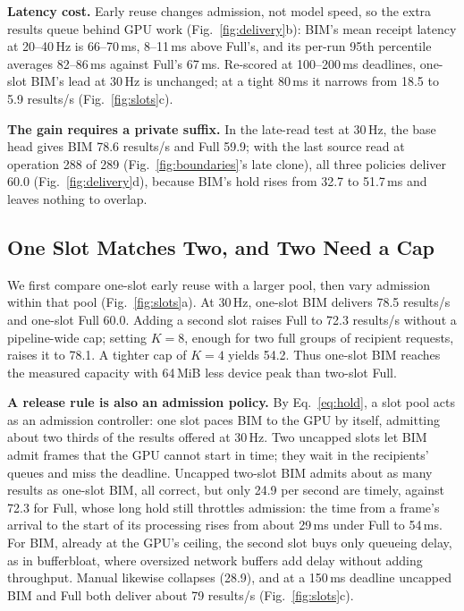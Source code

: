 \documentclass[conference]{IEEEtran}
\newcommand{\MiB}{\,MiB}
\newcommand{\ms}{\,ms}
\newcommand{\Hz}{\,Hz}
\begin{document}
\textbf{Latency cost.} Early reuse changes admission, not model speed, so the extra results queue behind GPU work (Fig.~\ref{fig:delivery}b): BIM's mean receipt latency at 20--40\Hz{} is 66--70\ms, 8--11\ms{} above Full's, and its per-run 95th percentile averages 82--86\ms{} against Full's 67\ms. Re-scored at 100--200\ms{} deadlines, one-slot BIM's lead at 30\Hz{} is unchanged; at a tight 80\ms{} it narrows from 18.5 to 5.9 results/s (Fig.~\ref{fig:slots}c).

\textbf{The gain requires a private suffix.}\label{sec:eval-late} In the late-read test at 30\Hz, the base head gives BIM 78.6 results/s and Full 59.9; with the last source read at operation 288 of 289 (Fig.~\ref{fig:boundaries}'s late clone), all three policies deliver 60.0 (Fig.~\ref{fig:delivery}d), because BIM's hold rises from 32.7 to 51.7\ms{} and leaves nothing to overlap.

\subsection{One Slot Matches Two, and Two Need a Cap}
\label{sec:eval-slots}

We first compare one-slot early reuse with a larger pool, then vary admission within that pool (Fig.~\ref{fig:slots}a). At 30\Hz, one-slot BIM delivers 78.5 results/s and one-slot Full 60.0. Adding a second slot raises Full to 72.3 results/s without a pipeline-wide cap; setting $K{=}8$, enough for two full groups of recipient requests, raises it to 78.1. A tighter cap of $K{=}4$ yields 54.2. Thus one-slot BIM reaches the measured capacity with 64\MiB{} less device peak than two-slot Full.

\textbf{A release rule is also an admission policy.} By Eq.~\eqref{eq:hold}, a slot pool acts as an admission controller: one slot paces BIM to the GPU by itself, admitting about two thirds of the results offered at 30\Hz. Two uncapped slots let BIM admit frames that the GPU cannot start in time; they wait in the recipients' queues and miss the deadline. Uncapped two-slot BIM admits about as many results as one-slot BIM, all correct, but only 24.9 per second are timely, against 72.3 for Full, whose long hold still throttles admission: the time from a frame's arrival to the start of its processing rises from about 29\ms{} under Full to 54\ms. For BIM, already at the GPU's ceiling, the second slot buys only queueing delay, as in bufferbloat, where oversized network buffers add delay without adding throughput. Manual likewise collapses (28.9), and at a 150\ms{} deadline uncapped BIM and Full both deliver about 79 results/s (Fig.~\ref{fig:slots}c).
\end{document}
